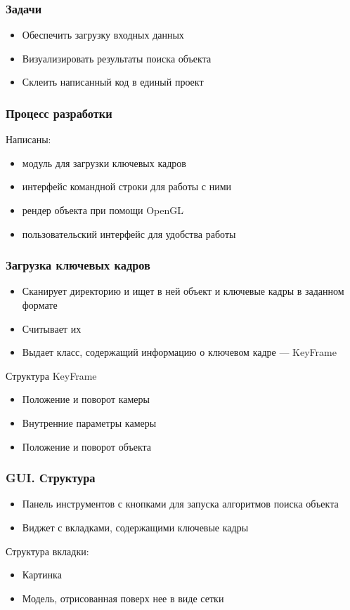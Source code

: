 \begin{frame}\frametitle{Задачи}
    \begin{itemize}
        \item Обеспечить загрузку входных данных
        \item Визуализировать результаты поиска объекта
        \item Склеить написанный код в единый проект
    \end{itemize}
\end{frame}

\begin{frame}\frametitle{Процесс разработки}
    Написаны:
    \begin{itemize}
        \item модуль для загрузки ключевых кадров
        \item интерфейс командной строки для работы с ними
        \item рендер объекта при помощи OpenGL
        \item пользовательский интерфейс для удобства работы
    \end{itemize}
\end{frame}

\begin{frame}\frametitle{Загрузка ключевых кадров}
    \begin{itemize}
        \item Сканирует директорию и ищет в ней объект и ключевые кадры в 
            заданном формате
        \item Считывает их
        \item Выдает класс, содержащий информацию о ключевом кадре --- KeyFrame
    \end{itemize}
    Структура KeyFrame
    \begin{itemize}
        \item Положение и поворот камеры
        \item Внутренние параметры камеры
        \item Положение и поворот объекта
    \end{itemize}
\end{frame}

\begin{frame}\frametitle{GUI. Структура}
    \begin{itemize}
        \item Панель инструментов с кнопками для запуска алгоритмов поиска 
            объекта
        \item Виджет с вкладками, содержащими ключевые кадры
    \end{itemize}
    Структура вкладки:
    \begin{itemize}
        \item Картинка
        \item Модель, отрисованная поверх нее в виде сетки
    \end{itemize}
\end{frame}

